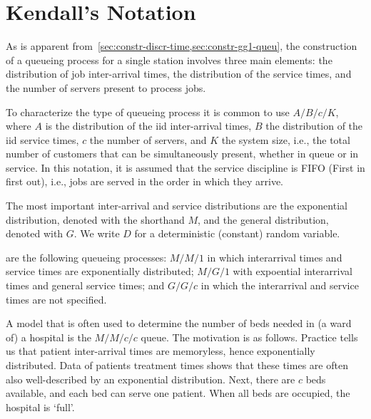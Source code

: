 
\section{Kendall's Notation}
\label{sec:kendalls-notation}

As is apparent from~\cref{sec:constr-discr-time,sec:constr-gg1-queu}, the construction of a queueing process for a single station involves three main elements: the distribution of job inter-arrival times, the distribution of the service times, and the number of servers present to process jobs.



To characterize the type of queueing process it is common to use
 $A/B/c/K$, where $A$ is the distribution of the
iid inter-arrival times, $B$ the distribution of the iid service times, $c$ the
number of servers, and $K$ the system size, i.e., the total number of customers that can be simultaneously present, whether in queue or in service.
In this notation, it is assumed that the  service discipline is FIFO (First in first out), i.e., jobs are served in the order in which they arrive.


The most important inter-arrival and service distributions are the exponential distribution, denoted with the shorthand $M$, and the general distribution,  denoted with $G$. We write $D$ for a deterministic (constant) random variable.

 are the following queueing processes: $M/M/1$ in which interarrival times and service times are exponentially distributed;  $M/G/1$ with expoential interarrival times and general service times; and $G/G/c$ in which the interarrival and service times are not specified.

A model that is often used to determine the number of beds needed in (a ward of) a hospital is the $M/M/c/c$ queue.
The motivation is as follows.
Practice tells us that patient inter-arrival times are memoryless, hence exponentially distributed.
Data of patients treatment times shows that these times are often also well-described by an exponential distribution.
Next, there are $c$ beds available, and each bed can serve one patient. When all beds are occupied, the hospital is `full'.



